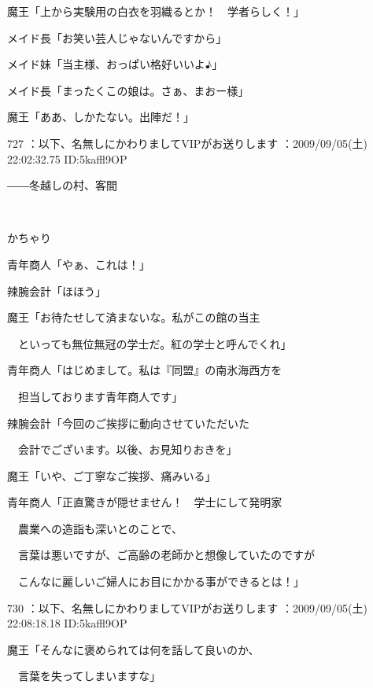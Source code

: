 \documentclass[a4j,twocolumn]{tarticle}
\begin{document}
魔王「上から実験用の白衣を羽織るとか！　学者らしく！」\par{} 
メイド長「お笑い芸人じゃないんですから」 



メイド妹「当主様、おっぱい格好いいよ♪」 



メイド長「まったくこの娘は。さぁ、まおー様」\par{} 
魔王「ああ、しかたない。出陣だ！」 

	
    
    

727 ：以下、名無しにかわりましてVIPがお送りします ：2009/09/05(土) 22:02:32.75 ID:5kaffl9OP 


――冬越しの村、客間 

　

かちゃり 



青年商人「やぁ、これは！」\par{} 
辣腕会計「ほほう」 



魔王「お待たせして済まないな。私がこの館の当主\par{} 
　といっても無位無冠の学士だ。紅の学士と呼んでくれ」 



青年商人「はじめまして。私は『同盟』の南氷海西方を\par{} 
　担当しております青年商人です」 



辣腕会計「今回のご挨拶に動向させていただいた\par{} 
　会計でございます。以後、お見知りおきを」 



魔王「いや、ご丁寧なご挨拶、痛みいる」 



青年商人「正直驚きが隠せません！　学士にして発明家\par{} 
　農業への造詣も深いとのことで、\par{} 
　言葉は悪いですが、ご高齢の老師かと想像していたのですが\par{} 
　こんなに麗しいご婦人にお目にかかる事ができるとは！」 

	
    
    

730 ：以下、名無しにかわりましてVIPがお送りします ：2009/09/05(土) 22:08:18.18 ID:5kaffl9OP 


魔王「そんなに褒められては何を話して良いのか、\par{} 
　言葉を失ってしまいますな」 
\end{document}
